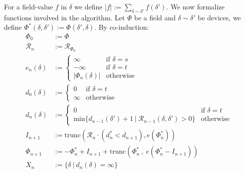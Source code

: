 \documentclass{article}
\theoremstyle{plain}
\theoremstyle{definition}
\theoremstyle{remark}
\begin{document}
For a field-value $f$ in $\delta$ we define $\displaystyle{|f|:=\sum_{\delta\sim\delta'}f(\delta')}$.
We now formalize functions involved in the algorithm. Let $\Phi$ be a field and $\delta\sim\delta'$ be  devices, we define $\Phi^*(\delta, \delta'):=\Phi(\delta', \delta)$.
By co-induction:
\begin{equation*}
\begin{split}
\Phi_0 &:= \Phi\\
\mathcal{R}_n&:= \mathcal{R}_{\Phi_n}\\
e_n(\delta)&:=
\begin{cases}
\infty &\text{if\ }\delta=s\\
-\infty &\text{if\ }\delta=t\\
|\Phi_n(\delta)| &\text{otherwise}
\end{cases}\\
d_0(\delta)&:=
\begin{cases} 
0 &\text{if\ }\delta=t\\
\infty&\text{otherwise}
\end{cases}\\
d_n(\delta)&:=
\begin{cases}
0 &\text{if\ }\delta=t\\
 \mathrm{min}\big\{d_{n-1}(\delta') + 1\ |\  \mathcal{R}_{n-1}(\delta, \delta')>0\big\}&\text{otherwise}
\end{cases}\\
I_{n+1}&:= \mathrm{trunc}(\mathcal{R}_n\cdot(d_n^*<d_{n+1}),  e(\Phi_n^*))\\
\Phi_{n+1}&:= -\Phi_n^* + I_{n+1} + \mathrm{trunc}(\Phi_n^*\ ,\  e(\Phi_n^* - I_{n+1}))\\
X_n&:=\{\delta \ |\ d_n(\delta)=\infty\}
\end{split}
\end{equation*}
\end{document}
